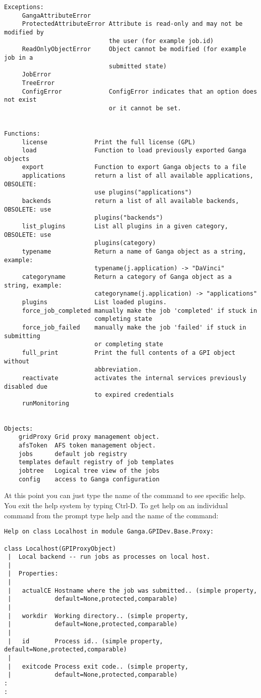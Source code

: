 \documentclass{howto}
\begin{document}
\begin{verbatim}
Exceptions:
     GangaAttributeError
     ProtectedAttributeError Attribute is read-only and may not be modified by
                             the user (for example job.id)
     ReadOnlyObjectError     Object cannot be modified (for example job in a
                             submitted state)
     JobError
     TreeError
     ConfigError             ConfigError indicates that an option does not exist
                             or it cannot be set.


Functions:
     license             Print the full license (GPL)
     load                Function to load previously exported Ganga objects
     export              Function to export Ganga objects to a file
     applications        return a list of all available applications, OBSOLETE:
                         use plugins("applications")
     backends            return a list of all available backends, OBSOLETE: use
                         plugins("backends")
     list_plugins        List all plugins in a given category, OBSOLETE: use
                         plugins(category)
     typename            Return a name of Ganga object as a string, example:
                         typename(j.application) -> "DaVinci"
     categoryname        Return a category of Ganga object as a string, example:
                         categoryname(j.application) -> "applications"
     plugins             List loaded plugins.
     force_job_completed manually make the job 'completed' if stuck in
                         completing state
     force_job_failed    manually make the job 'failed' if stuck in submitting
                         or completing state
     full_print          Print the full contents of a GPI object without
                         abbreviation.
     reactivate          activates the internal services previously disabled due
                         to expired credentials
     runMonitoring


Objects:
    gridProxy Grid proxy management object.
    afsToken  AFS token management object.
    jobs      default job registry
    templates default registry of job templates
    jobtree   Logical tree view of the jobs
    config    access to Ganga configuration

\end{verbatim}
At this point you can just type the name of the command to see specific help.
You exit the help system by typing Ctrl-D. To get help on an individual
command from the prompt type help and the name of the command:
\begin{verbatim}
Help on class Localhost in module Ganga.GPIDev.Base.Proxy:

class Localhost(GPIProxyObject)
 |  Local backend -- run jobs as processes on local host.
 |  
 |  Properties:
 |  
 |   actualCE Hostname where the job was submitted.. (simple property,
 |            default=None,protected,comparable)
 |  
 |   workdir  Working directory.. (simple property,
 |            default=None,protected,comparable)
 |  
 |   id       Process id.. (simple property, default=None,protected,comparable)
 |  
 |   exitcode Process exit code.. (simple property,
 |            default=None,protected,comparable)
:
:
\end{verbatim}
\end{document}
